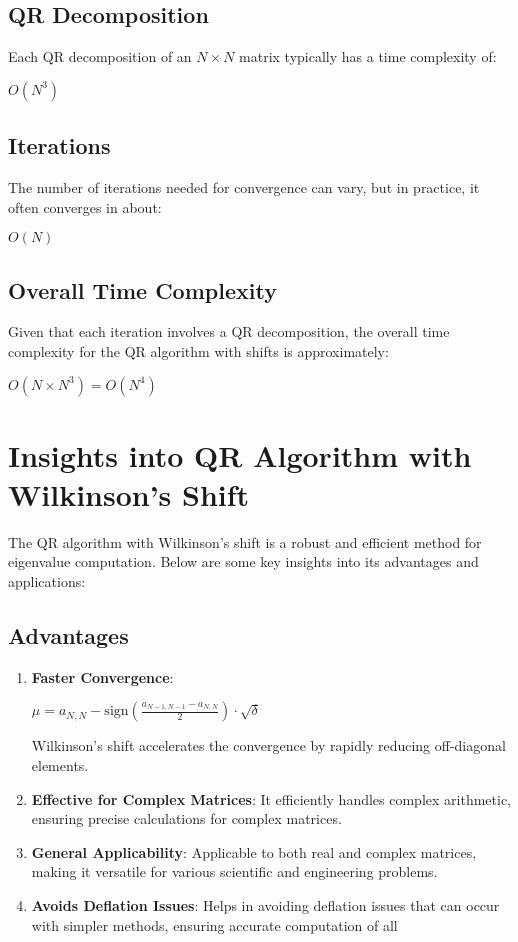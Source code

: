 \documentclass[journal]{IEEEtran}
\begin{document}
\subsection*{QR Decomposition} Each QR decomposition of an \(N \times N\) matrix typically has a time complexity of:
\begin{center}
    $O(N^3) $
\end{center} \subsection*{Iterations} The number of iterations needed for convergence can vary, but in practice, it often converges in about:
\begin{center}
    $ O(N)$
\end{center}
\subsection*{Overall Time Complexity} Given that each iteration involves a QR decomposition, the overall time complexity for the QR algorithm with shifts is approximately: 
\begin{center}
$O(N \times N^3) = O(N^4)$
\end{center}

\section{Insights into QR Algorithm with Wilkinson's Shift}
The QR algorithm with Wilkinson's shift is a robust and efficient method for eigenvalue computation. Below are some key insights into its advantages and applications:
\subsection*{Advantages}
\begin{enumerate}[label=\textbullet]
    \item \textbf{Faster Convergence}:
        \begin{center} $\mu = a_{N,N} - \text{sign}\left(\frac{a_{N-1,N-1} - a_{N,N}}{2}\right) \cdot \sqrt{\delta}$
    \end{center}
    Wilkinson's shift accelerates the convergence by rapidly reducing off-diagonal elements.
    \item \textbf{Effective for Complex Matrices}:
    It efficiently handles complex arithmetic, ensuring precise calculations for complex matrices.
    \item \textbf{General Applicability}: Applicable to both real and complex matrices, making it versatile for various scientific and engineering problems.
    \item \textbf{Avoids Deflation Issues}: Helps in avoiding deflation issues that can occur with simpler methods, ensuring accurate computation of all
\end{enumerate}
\end{document}
